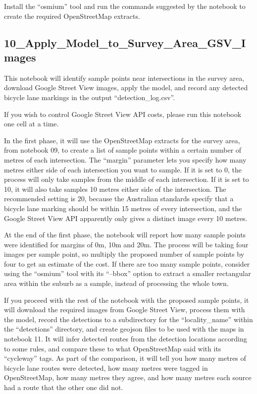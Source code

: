\documentclass[11pt,twoside]{report}
\begin{document}
Install the ``osmium'' tool and run the commands suggested by the notebook to create the required OpenStreetMap extracts.


\subsection{10\_Apply\_Model\_to\_Survey\_Area\_GSV\_Images}
\label{a10}

This notebook will identify sample points near intersections in the survey area, download Google Street View images, apply the model, and record any detected bicycle lane markings in the output ``detection\_log.csv''.

If you wish to control Google Street View API costs, please run this notebook one cell at a time.

In the first phase, it will use the OpenStreetMap extracts for the survey area, from notebook 09, to create a list of sample points within a certain number of metres of each intersection.  The ``margin'' parameter lets you specify how many metres either side of each intersection you want to sample.  If it is set to 0, the process will only take samples from the middle of each intersection.  If it is set to 10, it will also take samples 10 metres either side of the intersection.  The recommended setting is 20, because the Australian standards specify that a bicycle lane marking should be within 15 metres of every intersection, and the Google Street View API apparently only gives a distinct image every 10 metres.

At the end of the first phase, the notebook will report how many sample points were identified for margins of 0m, 10m and 20m.  The process will be taking four images per sample point, so multiply the proposed number of sample points by four to get an estimate of the cost.  If there are too many sample points, consider using the ``osmium'' tool with its ``--bbox'' option to extract a smaller rectangular area within the suburb as a sample, instead of processing the whole town.

If you proceed with the rest of the notebook with the proposed sample points, it will download the required images from Google Street View, process them with the model, record the detections to a subdirectory for the ``locality\_name'' within the ``detections'' directory, and create geojson files to be used with the maps in notebook 11.  It will infer detected routes from the detection locations according to some rules, and compare these to what OpenStreetMap said with its ``cycleway'' tags.  As part of the comparison, it will tell you how many metres of bicycle lane routes were detected, how many metres were tagged in OpenStreetMap, how many metres they agree, and how many metres each source had a route that the other one did not.
\end{document}

